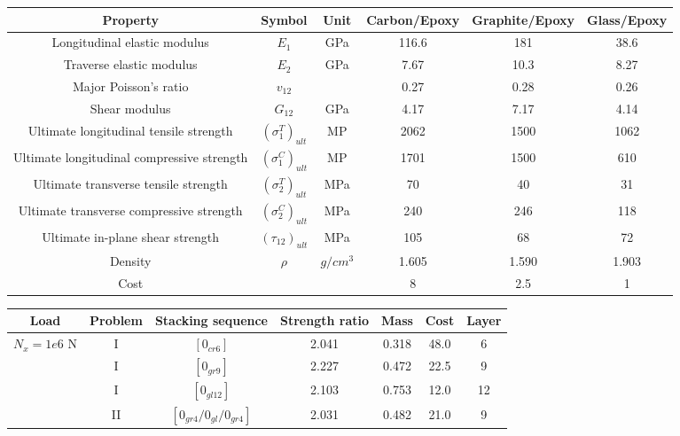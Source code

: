\documentclass[smallextended]{svjour3}       %
\begin{document}
\begin{tabular}{cccccc}
	\toprule
	Property								   & Symbol				  & Unit  &  Carbon/Epoxy&  Graphite/Epoxy  &  Glass/Epoxy   \\
	\midrule																								  
	Longitudinal elastic modulus			   & $E_1$				  & GPa   &  116.6       &  181             &  38.6           \\
	Traverse elastic modulus				   & $E_2$				  & GPa   &  7.67        &  10.3            &  8.27           \\
	Major Poisson's ratio					   & $v_{12}$			  &       &  0.27        &  0.28            &  0.26           \\
	Shear modulus							   & $G_{12}$			  & GPa   &  4.17        &  7.17            &  4.14           \\
	Ultimate longitudinal tensile strength     & $(\sigma_1^T)_{ult}$ & MP    &  2062        &  1500            &  1062            \\
	Ultimate longitudinal compressive strength & $(\sigma_1^C)_{ult}$ & MP    &  1701        &  1500            &  610             \\
	Ultimate transverse tensile strength       & $(\sigma_2^T)_{ult}$ & MPa   &  70          &  40              &  31              \\
	Ultimate transverse compressive strength   & $(\sigma_2^C)_{ult}$ & MPa   &  240         &  246             &  118              \\
	Ultimate in-plane shear strength           & $(\tau_{12})_{ult}$  & MPa   &  105         &  68              &  72               \\
	Density                                    & $\rho$               & $g/cm^3$ &  1.605    &  1.590           &  1.903               \\
	Cost                                       &                      &       &  8           &  2.5             &  1               \\
	\bottomrule
\end{tabular}
\label{tab:mat}



\begin{tabular}{ccccccc}
	\toprule
	Load         &  Problem             & Stacking sequence        & Strength ratio  & Mass &  Cost   & Layer    \\
	\midrule
	  \multirow{4}{*}{$N_{x}=1e6$ N}  &    I      &  $[0_{cr6}]$                             & 2.041           & 0.318 &  48.0  & 6  \\
									  &     I     &  $[0_{gr9}]$                      & 2.227           & 0.472 &  22.5  & 9  \\
		         	                  &     I     &  $[0_{gl12}]$                             & 2.103           & 0.753 &  12.0  & 12  \\
									  &     II    &  $[0_{gr4}/0_{gl}/0_{gr4}]$                      & 2.031           & 0.482 &  21.0  & 9 \\
	\bottomrule
\end{tabular}
\end{document}
